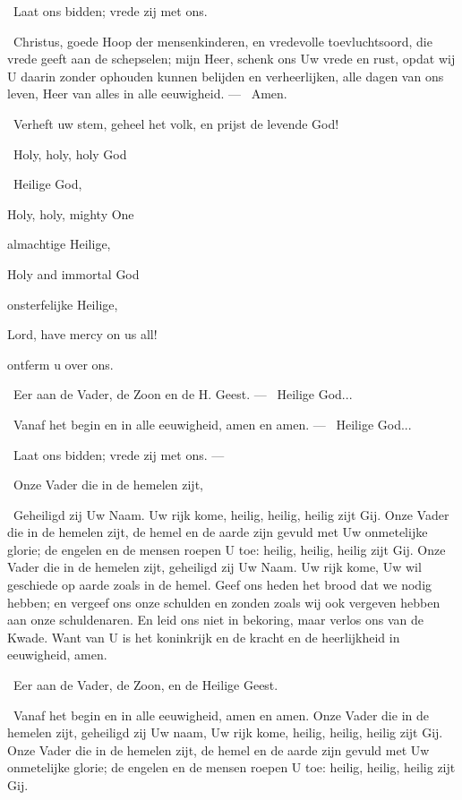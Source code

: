 \documentclass[12pt,twoside,a5paper]{article}
\begin{document}
\rr\ Laat ons bidden; vrede zij met ons.

\cc\ Christus, goede Hoop der mensenkinderen, en vredevolle toevluchtsoord, die vrede geeft aan de schepselen; mijn Heer, schenk ons Uw vrede en rust, opdat wij U daarin zonder ophouden kunnen belijden en verheerlijken, alle dagen van ons leven, Heer van alles in alle eeuwigheid. --- \rr\ Amen.

\dd\ Verheft uw stem, geheel het volk, en prijst de levende God!

\begin{doublecols}
  \englishl \rr\ Holy, holy, holy God

   \rr\ Heilige God,

  \englishl Holy, holy, mighty One

   almachtige Heilige,

  \englishl Holy and immortal God

   onsterfelijke Heilige,

  \englishl Lord, have mercy on us all!

   ontferm u over ons.
\end{doublecols}

\dd\ Eer aan de Vader, de Zoon en de H. Geest. --- \rr\ Heilige God...

\dd\ Vanaf het begin en in alle eeuwigheid, amen en amen. --- \rr\ Heilige God...

\rr\ Laat ons bidden; vrede zij met ons. --- 

\cc\ Onze Vader die in de hemelen zijt,

\rr\ Geheiligd zij Uw Naam. Uw rijk kome, heilig, heilig, heilig zijt Gij. Onze Vader die in de hemelen zijt, de hemel en de aarde zijn gevuld met Uw onmetelijke glorie; de engelen en de mensen roepen U toe: heilig, heilig, heilig zijt Gij. Onze Vader die in de hemelen zijt, geheiligd zij Uw Naam. Uw rijk kome, Uw wil geschiede op aarde zoals in de hemel. Geef ons heden het brood dat we nodig hebben; en vergeef ons onze schulden en zonden zoals wij ook vergeven hebben aan onze schuldenaren. En leid ons niet in bekoring, maar verlos ons van de Kwade. Want van U is het koninkrijk en de kracht en de heerlijkheid in eeuwigheid, amen.

\cc\ Eer aan de Vader, de Zoon, en de Heilige Geest.

\rr\ Vanaf het begin en in alle eeuwigheid, amen en amen. Onze Vader die in de hemelen zijt, geheiligd zij Uw naam, Uw rijk kome, heilig, heilig, heilig zijt Gij. Onze Vader die in de hemelen zijt, de hemel en de aarde zijn gevuld met Uw onmetelijke glorie; de engelen en de mensen roepen U toe: heilig, heilig, heilig zijt Gij.
\end{document}
